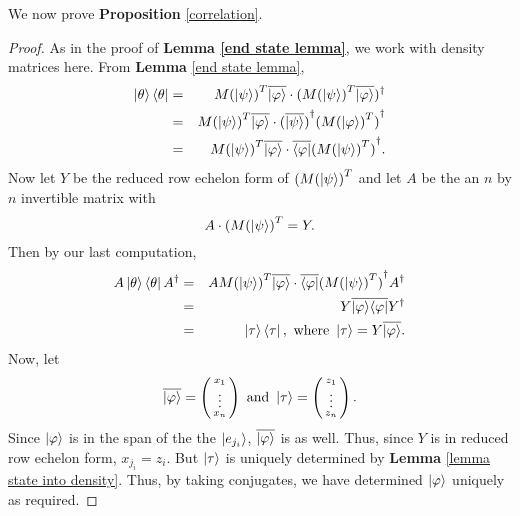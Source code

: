 We now prove {\bf{Proposition}} \ref{correlation}.
\begin{proof}
As in the proof of {\bf{Lemma} \ref{end state lemma}}, we work with density matrices here.  From {\bf{Lemma}} \ref{end state lemma},
\begin{eqnarray}
\ket{\theta}\bra{\theta}&=&{M(\ket{\psi})}^T\overline{\ket{\varphi}}\cdot({M(\ket{\psi})}^T\overline{\ket{\varphi}})^\dagger\\
&=&{M(\ket{\psi})}^T\overline{\ket{\varphi}}\cdot {(\overline{\ket{\psi}})}^\dagger {({M(\ket{\varphi})}^T)}^\dagger \\
&=&{M(\ket{\psi})}^T\overline{\ket{\varphi}}\cdot \overline{\bra{\varphi}} {({M(\ket{\psi})}^T)}^\dagger.
\end{eqnarray}
Now let $Y$ be the reduced row echelon form of $({M(\ket{\psi})}^T$ and let $A$ be the an $n$ by $n$ invertible matrix with
\begin{equation}
A \cdot ({M(\ket{\psi})}^T=Y.
\end{equation}
Then by our last computation,
\begin{eqnarray}
A\ket{\theta}\bra{\theta}A^\dagger&=&A {M(\ket{\psi})}^T\overline{\ket{\varphi}}\cdot \overline{\bra{\varphi}} {({M(\ket{\psi})}^T)}^\dagger A^\dagger\\
&=&Y \overline{\ket{\varphi}} \overline{\bra{\varphi}} Y^\dagger\\
&=& \ket{\tau}\bra{\tau},\textrm{ where }\ket{\tau}=Y\overline{\ket{\varphi}}.
\end{eqnarray}
Now, let 
\begin{equation}
\overline{\ket{\varphi}}=\left(\begin{smallmatrix}x_1 \\ \vdots \\ x_n\end{smallmatrix}\right) \textrm{ and }\ket{\tau}=\left(\begin{smallmatrix}z_1\\ \vdots \\ z_n\end{smallmatrix}\right).
\end{equation}
Since $\ket{\varphi}$ is in the span of the the $\ket{e_{j_i}}$, $\overline{\ket{\varphi}}$ is as well.  Thus, since $Y$ is in reduced row echelon form, $x_{j_i}=z_i$.  But $\ket{\tau}$ is uniquely determined by {\bf{Lemma}} \ref{lemma state into density}.  Thus, by taking conjugates, we have determined $\ket{\varphi}$ uniquely as required.


\end{proof} 

